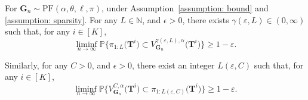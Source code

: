 \documentclass[twoside,11pt]{article}
\theoremstyle{remark}
\begin{document}





\begin{lemma}
\label{lemma order--degree}
For $\boldsymbol{G}_n \sim \mathrm{PF}(\alpha, \theta, \ell, \pi)$, under Assumption~\ref{assumption: bound} and \ref{assumption: sparsity}. For any $L\in \mathbb{N}$, and $\epsilon>0$, there exists $\gamma\left(\varepsilon, L\right) \in (0, \infty)$ such that, for any $i \in [K]$,
%
\begin{equation}
\label{order to degree}
     \liminf_{n \rightarrow \infty} \mathbb{P}\biggl\{\pi_{1:L}\bigl(\boldsymbol{T}^i\bigr)\subset V^{\gamma(\varepsilon, L), \alpha}_{\boldsymbol{G}_n}\bigl(\boldsymbol{T}^i \bigr)\biggr\} \ge 1-\varepsilon.
\end{equation}
%

Similarly, for any $C > 0$, and $\epsilon>0$, there exist an integer $L\left(\varepsilon, C\right)$ such that, for any $i \in [K]$,
%
\begin{equation}
\label{degree to order}
     \liminf_{n \rightarrow \infty} \mathbb{P}\biggl\{ V^{C,\alpha}_{\boldsymbol{G}_n}\bigl(\boldsymbol{T}^i\bigr)\subset\pi_{1:{L\left(\varepsilon, C\right)}}\bigl(\boldsymbol{T}^i\bigr)\biggr\}\ge 1-\varepsilon.
\end{equation}
%
\end{lemma}
\end{document}

